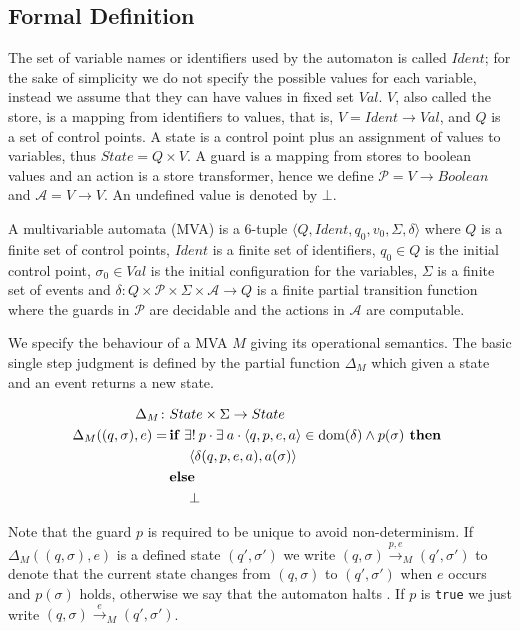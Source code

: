 \documentclass[a4paper,10pt]{article}
\def\fun{\rightarrow}
\DeclareMathOperator{\dom}{dom}
\theoremstyle{definition}
\begin{document}
\subsection*{Formal Definition}
The set of variable names or identifiers used by the automaton is called $Ident$; for the sake of simplicity
we do not specify the possible values for each variable, instead we assume that they can have values in fixed
set $Val$. $V$, also called the store, is a mapping from identifiers to values, that is, $V = Ident \fun Val$,
and $Q$ is a set of control points. A state is a control point plus an assignment of values to variables, thus
$State = Q \times V$. A guard is a mapping from stores to boolean values and an action is a store transformer,
hence we define $\mathcal P = V \fun Boolean$ and $\mathcal A = V \fun V$. An undefined value is denoted by
$\bot$.

A multivariable automata (MVA) is a 6-tuple $\langle Q, Ident, q_0, v_0, \Sigma, \delta \rangle$ where $Q$ is
a finite set of control points, $Ident$ is a finite set of identifiers, $q_0 \in Q$ is the initial control
point, $\sigma_0 \in Val$ is the initial configuration for the variables, $\Sigma$ is a finite set of events
and $\delta \colon Q \times \mathcal P \times \Sigma \times \mathcal A \fun Q$ is a finite partial transition
function where the guards in $\mathcal P$ are decidable and the actions in $\mathcal A$ are computable. 

We specify the behaviour of a MVA $M$ giving its operational semantics. The basic single step judgment is
defined by the partial function $\Delta_M$ which given a state and an event returns a new state.

\begin{align*}
\Delta_M \colon & State \times \Sigma \fun State\\
\Delta_M((q, \sigma), e) =\,& \textbf{if } \exists!\: p \cdot \exists\: a \cdot
\langle q,p,e,a \rangle \in \dom(\delta) \wedge p(\sigma) \textbf{ then }\\
& \hspace{0.5cm} \langle \delta(q,p,e,a), a(\sigma) \rangle\\
& \textbf{else}\\
& \hspace{0.5cm} \bot
\end{align*}

Note that the guard $p$ is required to be unique to avoid non-determinism. If $\Delta_M((q,\sigma),e)$ is a
defined state $(q',\sigma')$ we write $(q,\sigma) \stackrel{p,e}{\longrightarrow}_M (q',\sigma')$ to denote
that the current state changes from $(q,\sigma)$ to $(q',\sigma')$ when $e$ occurs and $p(\sigma)$ holds,
otherwise we say that the automaton halts . If $p$ is \texttt{true} we just write $(q,\sigma)
\stackrel{e}{\longrightarrow}_M (q',\sigma')$.
\end{document}
